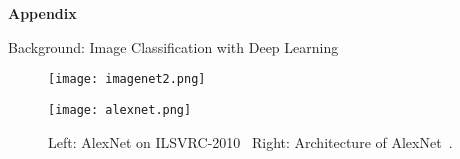 


\begin{refsection}
  \begin{frame}[plain]
    \vfill
    \centering
    {\Huge \textbf{Appendix}}
    \vfill
  \end{frame}
\end{refsection}

\begin{refsection}
  \begin{frame}{Background: Image Classification with Deep Learning}
    \begin{figure}
      \centering
      \begin{minipage}{0.48\linewidth}
        \centering
        \texttt{[image: imagenet2.png]}
      \end{minipage}\hfill
      \begin{minipage}{0.48\linewidth}
        \centering
        \texttt{[image: alexnet.png]}
      \end{minipage}
      \caption[]{\scriptsize Left: AlexNet on ILSVRC-2010~\parencite{imagenet2010challenge} \quad Right: Architecture of AlexNet~\parencite{krizhevskyImageNetClassificationDeep2012}.}
    \end{figure}
    \bottomleftrefs
  \end{frame}
\end{refsection}



